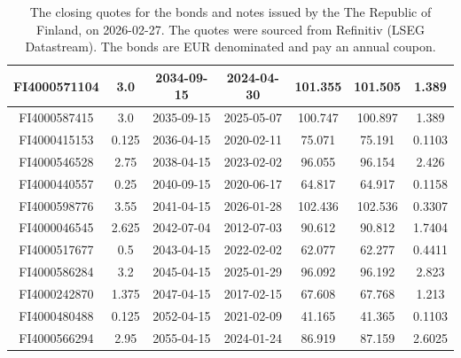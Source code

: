 \documentclass[a4paper]{artikel3}
\numberwithin{equation}{section}
\numberwithin{theorem}{section}
\numberwithin{proposition}{section}
\numberwithin{lemma}{section}
\begin{document}
\begin{table}[h!]
\begin{tabular}{| c | c | c | c | c | c | c |}
\hline
FI4000571104 & 3.0 & 2034-09-15 & 2024-04-30 & 101.355 & 101.505 & 1.389 \\
\hline
FI4000587415 & 3.0 & 2035-09-15 & 2025-05-07 & 100.747 & 100.897 & 1.389 \\
\hline
FI4000415153 & 0.125 & 2036-04-15 & 2020-02-11 & 75.071 & 75.191 & 0.1103 \\
\hline
FI4000546528 & 2.75 & 2038-04-15 & 2023-02-02 & 96.055 & 96.154 & 2.426 \\
\hline
FI4000440557 & 0.25 & 2040-09-15 & 2020-06-17 & 64.817 & 64.917 & 0.1158 \\
\hline
FI4000598776 & 3.55 & 2041-04-15 & 2026-01-28 & 102.436 & 102.536 & 0.3307 \\
\hline
FI4000046545 & 2.625 & 2042-07-04 & 2012-07-03 & 90.612 & 90.812 & 1.7404 \\
\hline
FI4000517677 & 0.5 & 2043-04-15 & 2022-02-02 & 62.077 & 62.277 & 0.4411 \\
\hline
FI4000586284 & 3.2 & 2045-04-15 & 2025-01-29 & 96.092 & 96.192 & 2.823 \\
\hline
FI4000242870 & 1.375 & 2047-04-15 & 2017-02-15 & 67.608 & 67.768 & 1.213 \\
\hline
FI4000480488 & 0.125 & 2052-04-15 & 2021-02-09 & 41.165 & 41.365 & 0.1103 \\
\hline
FI4000566294 & 2.95 & 2055-04-15 & 2024-01-24 & 86.919 & 87.159 & 2.6025 \\
\hline
    \end{tabular}
    \caption{The closing quotes for the bonds and notes issued by the The Republic of Finland, on 2026-02-27. The quotes were sourced from Refinitiv (LSEG Datastream). The bonds are EUR denominated and pay an annual coupon.}
    \label{tab:bonds_20260227}
\end{table}
\end{document}
